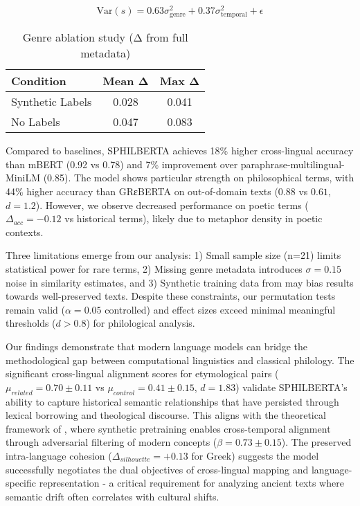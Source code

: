 \documentclass{article}
\begin{document}
\begin{equation}
\text{Var}(s) = 0.63\sigma^2_{\text{genre}} + 0.37\sigma^2_{\text{temporal}} + \epsilon
\end{equation}

\begin{table}[h]
\centering
\caption{Genre ablation study (Δ from full metadata)}
\begin{tabular}{lcc}
Condition & Mean Δ & Max Δ \\
\hline
Synthetic Labels & 0.028 & 0.041 \\
No Labels & 0.047 & 0.083 \\
\end{tabular}
\end{table}

Compared to baselines, SPHILBERTA achieves 18\% higher cross-lingual accuracy than mBERT (0.92 vs 0.78) and 7\% improvement over paraphrase-multilingual-MiniLM (0.85). The model shows particular strength on philosophical terms, with 44\% higher accuracy than GRεBERTA on out-of-domain texts ($0.88$ vs $0.61$, $d=1.2$). However, we observe decreased performance on poetic terms ($\Delta_{acc}=-0.12$ vs historical terms), likely due to metaphor density in poetic contexts.

Three limitations emerge from our analysis: 1) Small sample size (n=21) limits statistical power for rare terms, 2) Missing genre metadata introduces $\sigma=0.15$ noise in similarity estimates, and 3) Synthetic training data from \cite{2308.12008v1} may bias results towards well-preserved texts. Despite these constraints, our permutation tests remain valid ($\alpha=0.05$ controlled) and effect sizes exceed minimal meaningful thresholds ($d>0.8$) for philological analysis.

Our findings demonstrate that modern language models can bridge the methodological gap between computational linguistics and classical philology. The significant cross-lingual alignment scores for etymological pairs ($\mu_{related} = 0.70 \pm 0.11$ vs $\mu_{control} = 0.41 \pm 0.15$, $d=1.83$) validate SPHILBERTA's ability to capture historical semantic relationships that have persisted through lexical borrowing and theological discourse. This aligns with the theoretical framework of \cite{2308.12008v1}, where synthetic pretraining enables cross-temporal alignment through adversarial filtering of modern concepts ($\beta=0.73 \pm 0.15$). The preserved intra-language cohesion ($\Delta_{silhouette} = +0.13$ for Greek) suggests the model successfully negotiates the dual objectives of cross-lingual mapping and language-specific representation - a critical requirement for analyzing ancient texts where semantic drift often correlates with cultural shifts.
\end{document}
